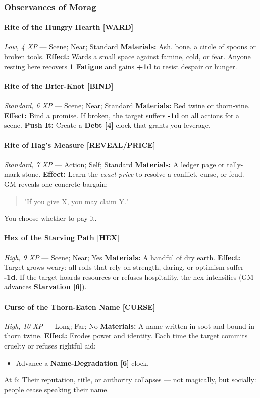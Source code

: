 \documentclass[11pt]{book}
\begin{document}
\subsubsection{Observances of Morag}

\paragraph{Rite of the Hungry Hearth [WARD]}
\emph{Low, 4 XP} --- Scene; Near; Standard  
\textbf{Materials:} Ash, bone, a circle of spoons or broken tools.  
\textbf{Effect:} Wards a small space against famine, cold, or fear.  
Anyone resting here recovers \textbf{1 Fatigue} and gains \textbf{+1d} to resist despair or hunger.

\paragraph{Rite of the Brier-Knot [BIND]}
\emph{Standard, 6 XP} --- Scene; Near; Standard  
\textbf{Materials:} Red twine or thorn-vine.  
\textbf{Effect:} Bind a promise. If broken, the target suffers \textbf{-1d} on all actions for a scene.  
\textbf{Push It:} Create a \textbf{Debt [4]} clock that grants you leverage.

\paragraph{Rite of Hag's Measure [REVEAL/PRICE]}
\emph{Standard, 7 XP} --- Action; Self; Standard  
\textbf{Materials:} A ledger page or tally-mark stone.  
\textbf{Effect:} Learn the \emph{exact price} to resolve a conflict, curse, or feud.  
GM reveals one concrete bargain:  
\begin{quote}
    "If you give X, you may claim Y."
\end{quote}
You choose whether to pay it.

\paragraph{Hex of the Starving Path [HEX]}
\emph{High, 9 XP} --- Scene; Near; Yes  
\textbf{Materials:} A handful of dry earth.  
\textbf{Effect:} Target grows weary; all rolls that rely on strength, daring, or optimism suffer \textbf{-1d}.  
If the target hoards resources or refuses hospitality, the hex intensifies (GM advances \textbf{Starvation [6]}).

\paragraph{Curse of the Thorn-Eaten Name [CURSE]}
\emph{High, 10 XP} --- Long; Far; No  
\textbf{Materials:} A name written in soot and bound in thorn twine.  
\textbf{Effect:} Erodes power and identity.  
Each time the target commits cruelty or refuses rightful aid:
\begin{itemize}[leftmargin=*]
    \item Advance a \textbf{Name-Degradation [6]} clock.
\end{itemize}
At 6: Their reputation, title, or authority collapses ---  
not magically, but socially: people cease speaking their name.
\end{document}
